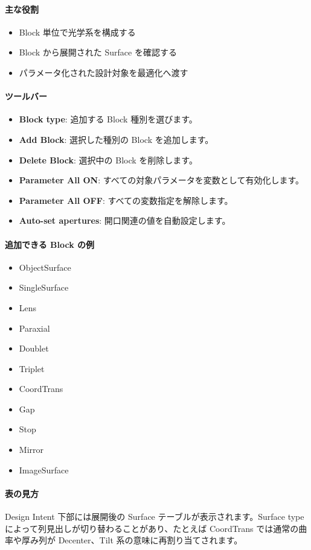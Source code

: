 \documentclass[11pt]{article}
\begin{document}
\paragraph{主な役割}
\begin{itemize}
  \item Block 単位で光学系を構成する
  \item Block から展開された Surface を確認する
  \item パラメータ化された設計対象を最適化へ渡す
\end{itemize}

\paragraph{ツールバー}
\begin{itemize}
  \item \textbf{Block type}: 追加する Block 種別を選びます。
  \item \textbf{Add Block}: 選択した種別の Block を追加します。
  \item \textbf{Delete Block}: 選択中の Block を削除します。
  \item \textbf{Parameter All ON}: すべての対象パラメータを変数として有効化します。
  \item \textbf{Parameter All OFF}: すべての変数指定を解除します。
  \item \textbf{Auto-set apertures}: 開口関連の値を自動設定します。
\end{itemize}

\paragraph{追加できる Block の例}
\begin{itemize}
  \item ObjectSurface
  \item SingleSurface
  \item Lens
  \item Paraxial
  \item Doublet
  \item Triplet
  \item CoordTrans
  \item Gap
  \item Stop
  \item Mirror
  \item ImageSurface
\end{itemize}

\paragraph{表の見方}
Design Intent 下部には展開後の Surface テーブルが表示されます。Surface type によって列見出しが切り替わることがあり、たとえば CoordTrans では通常の曲率や厚み列が Decenter、Tilt 系の意味に再割り当てされます。
\end{document}
